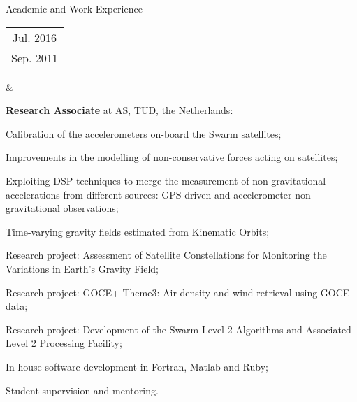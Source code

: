 \documentclass[a4paper,9pt]{article}
\begin{document}
\begin{cvsection}{Academic and Work Experience}
  \begin{tabular}{c}
  Jul. 2016 \\
  Sep. 2011 \\ 
  \end{tabular} 
  &
  \begin{itti}
    \item \textbf{Research Associate} at \acl{AS}, \ac{TUD}, the Netherlands:
    \begin{ittib}
      \item Calibration of the accelerometers on-board the Swarm satellites;
      \item Improvements in the modelling of non-conservative forces acting on satellites;
      \item Exploiting \acf{DSP} techniques to merge the measurement of non-gravitational accelerations from different sources: \ac{GPS}-driven and accelerometer non-gravitational observations;
      \item Time-varying gravity fields estimated from Kinematic Orbits;
      \item Research project: Assessment of Satellite Constellations for Monitoring the Variations in Earth's Gravity Field;
      \item Research project: GOCE+ Theme3: Air density and wind retrieval using \acf{GOCE} data;
      \item Research project: Development of the Swarm Level 2 Algorithms and Associated Level 2 Processing Facility;
      \item In-house software development in Fortran, Matlab and Ruby;
      \item Student supervision and mentoring.
    \end{ittib}
  \end{itti}\\


\end{cvsection}
\end{document}
